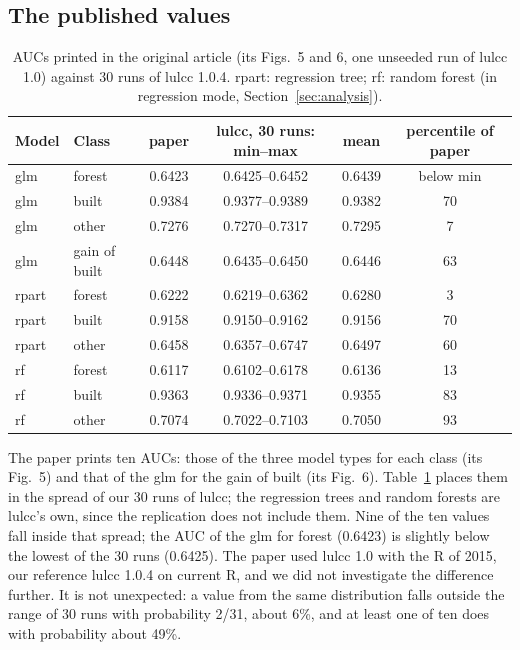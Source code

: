 \subsection{The published values}
\label{sec:published}

\begin{table}[!t]
\footnotesize
\setlength{\tabcolsep}{5pt}
\begin{tabular}{llcccc}
\toprule
Model & Class & paper & lulcc, 30 runs: min--max & mean & percentile of paper \\
\midrule
glm   & forest        & 0.6423 & 0.6425--0.6452 & 0.6439 & below min \\
glm   & built         & 0.9384 & 0.9377--0.9389 & 0.9382 & 70 \\
glm   & other         & 0.7276 & 0.7270--0.7317 & 0.7295 & 7 \\
glm   & gain of built & 0.6448 & 0.6435--0.6450 & 0.6446 & 63 \\
rpart & forest        & 0.6222 & 0.6219--0.6362 & 0.6280 & 3 \\
rpart & built         & 0.9158 & 0.9150--0.9162 & 0.9156 & 70 \\
rpart & other         & 0.6458 & 0.6357--0.6747 & 0.6497 & 60 \\
rf    & forest        & 0.6117 & 0.6102--0.6178 & 0.6136 & 13 \\
rf    & built         & 0.9363 & 0.9336--0.9371 & 0.9355 & 83 \\
rf    & other         & 0.7074 & 0.7022--0.7103 & 0.7050 & 93 \\
\bottomrule
\end{tabular}
\caption{AUCs printed in the original article (its Figs.~5 and 6, one unseeded run of
lulcc 1.0) against 30 runs of lulcc 1.0.4. rpart: regression tree; rf: random forest
(in regression mode, Section~\ref{sec:analysis}).}
\label{tab:published}
\end{table}


The paper prints ten AUCs: those of the three model types for each class (its Fig.~5)
and that of the glm for the gain of built (its Fig.~6). Table~\ref{tab:published} places
them in the spread of our 30 runs of lulcc; the regression trees and random forests are
lulcc's own, since the replication does not include them. Nine of the ten values fall
inside that spread; the AUC of the glm for forest (0.6423) is slightly below the lowest of
the 30 runs (0.6425). The paper used lulcc 1.0 with the R of 2015, our reference lulcc
1.0.4 on current R, and we did not investigate the difference further. It is not
unexpected: a value from the same distribution falls outside the range of 30 runs with
probability 2/31, about 6\%, and at least one of ten does with probability about 49\%.

